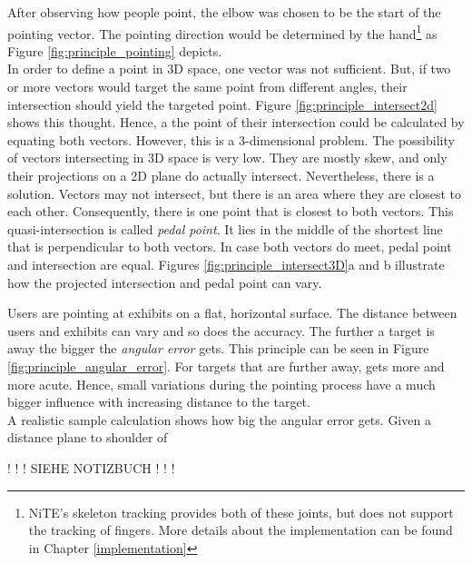 After observing how people point, the elbow was chosen to be the start of the pointing vector. The pointing direction would be determined by the hand\footnote{NiTE's skeleton tracking provides both of these joints, but does not support the tracking of fingers. More details about the implementation can be found in Chapter \ref{implementation}} as Figure \ref{fig:principle_pointing} depicts.
\\
In order to define a point in \ac{3D} space, one vector was not sufficient. But, if two or more vectors would target the same point from different angles, their intersection should yield the targeted point. Figure \ref{fig:principle_intersect2d} shows this thought. Hence, a the point of their intersection could be calculated by equating both vectors. However, this is a 3-dimensional problem. The possibility of vectors intersecting in \ac{3D} space is very low. They are mostly skew, and only their projections on a \ac{2D} plane do actually intersect. Nevertheless, there is a solution. Vectors may not intersect, but there is an area where they are closest to each other. Consequently, there is one point that is closest to both vectors. This quasi-intersection is called \textit{pedal point}. It lies in the middle of the shortest line that is perpendicular to both vectors. In case both vectors do meet, pedal point and intersection are equal. Figures \ref{fig:principle_intersect3D}a and b illustrate how the projected intersection and pedal point can vary.


Users are pointing at exhibits on a flat, horizontal surface. The distance between users and exhibits can vary and so does the accuracy. The further a target is away the bigger the \textit{angular error} gets. This principle can be seen in Figure \ref{fig:principle_angular_error}. For targets that are further away, \alpha gets more and more acute. Hence, small variations during the pointing process have a much bigger influence with increasing distance to the target.
\\
A realistic sample calculation shows how big the angular error gets. Given a distance plane to shoulder of 

																						! ! ! SIEHE NOTIZBUCH ! ! !

